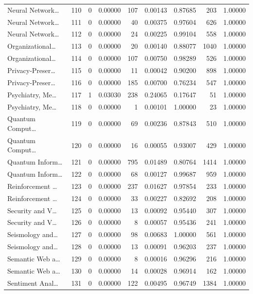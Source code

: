\begin{table}
\begin{tabular}{lrrrrrrrr}
Neural Network… & 110 & 0 & 0.00000 & 107 & 0.00143 & 0.87685 & 203 & 1.00000 \\
Neural Network… & 111 & 0 & 0.00000 & 40 & 0.00375 & 0.97604 & 626 & 1.00000 \\
Neural Network… & 112 & 0 & 0.00000 & 24 & 0.00225 & 0.99104 & 558 & 1.00000 \\
Organizational… & 113 & 0 & 0.00000 & 20 & 0.00140 & 0.88077 & 1040 & 1.00000 \\
Organizational… & 114 & 0 & 0.00000 & 107 & 0.00750 & 0.98289 & 526 & 1.00000 \\
Privacy-Preser… & 115 & 0 & 0.00000 & 11 & 0.00042 & 0.90200 & 898 & 1.00000 \\
Privacy-Preser… & 116 & 0 & 0.00000 & 185 & 0.00700 & 0.76234 & 547 & 1.00000 \\
Psychiatry, Me… & 117 & 1 & 0.03030 & 238 & 0.24065 & 0.17647 & 51 & 1.00000 \\
Psychiatry, Me… & 118 & 0 & 0.00000 & 1 & 0.00101 & 1.00000 & 23 & 1.00000 \\
Quantum Comput… & 119 & 0 & 0.00000 & 69 & 0.00236 & 0.87843 & 510 & 1.00000 \\
Quantum Comput… & 120 & 0 & 0.00000 & 16 & 0.00055 & 0.93007 & 429 & 1.00000 \\
Quantum Inform… & 121 & 0 & 0.00000 & 795 & 0.01489 & 0.80764 & 1414 & 1.00000 \\
Quantum Inform… & 122 & 0 & 0.00000 & 68 & 0.00127 & 0.99687 & 959 & 1.00000 \\
Reinforcement … & 123 & 0 & 0.00000 & 237 & 0.01627 & 0.97854 & 233 & 1.00000 \\
Reinforcement … & 124 & 0 & 0.00000 & 33 & 0.00227 & 0.82692 & 208 & 1.00000 \\
Security and V… & 125 & 0 & 0.00000 & 13 & 0.00092 & 0.95440 & 307 & 1.00000 \\
Security and V… & 126 & 0 & 0.00000 & 8 & 0.00057 & 0.95436 & 241 & 1.00000 \\
Seismology and… & 127 & 0 & 0.00000 & 98 & 0.00683 & 1.00000 & 561 & 1.00000 \\
Seismology and… & 128 & 0 & 0.00000 & 13 & 0.00091 & 0.96203 & 237 & 1.00000 \\
Semantic Web a… & 129 & 0 & 0.00000 & 8 & 0.00016 & 0.96296 & 216 & 1.00000 \\
Semantic Web a… & 130 & 0 & 0.00000 & 14 & 0.00028 & 0.96914 & 162 & 1.00000 \\
Sentiment Anal… & 131 & 0 & 0.00000 & 122 & 0.00495 & 0.96749 & 1384 & 1.00000 \\

\end{tabular}
\end{table}
